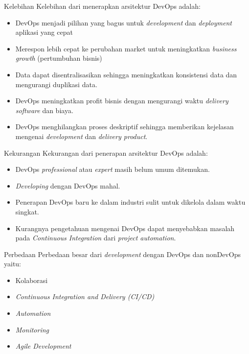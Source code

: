 \documentclass{beamer}
\begin{document}
	\begin{frame}{Kelebihan}
		Kelebihan dari menerapkan arsitektur DevOps adalah:
		\begin{itemize}
			\item DevOps menjadi pilihan yang bagus untuk \textit{development} dan \textit{deployment} aplikasi yang cepat
			\item Merespon lebih cepat ke perubahan market untuk meningkatkan \textit{business growth} (pertumbuhan bisnis)
			\item Data dapat disentralisasikan sehingga meningkatkan konsistensi data dan mengurangi duplikasi data.
			\item DevOps meningkatkan profit bisnis dengan mengurangi waktu \textit{delivery software} dan biaya.
			\item DevOps menghilangkan proses deskriptif sehingga memberikan kejelasan mengenai \textit{development} dan \textit{delivery product}.
			
		\end{itemize}
	\end{frame}
	
	\begin{frame}{Kekurangan}
		Kekurangan dari penerapan arsitektur DevOps adalah:
		\begin{itemize}
			\item DevOps \textit{professional} atau \textit{expert} masih belum umum ditemukan.
			\item \textit{Developing} dengan DevOps mahal.
			\item Penerapan DevOps baru ke dalam industri sulit untuk dikelola dalam waktu singkat.
			\item 	Kurangnya pengetahuan mengenai DevOps dapat menyebabkan masalah pada \textit{Continuous Integration} dari \textit{project automation}.
		\end{itemize}
	\end{frame}
	
	\begin{frame}{Perbedaan}
		Perbedaan besar dari \textit{development} dengan DevOps dan nonDevOps yaitu:
		\begin{itemize}
			\item Kolaborasi
			\item \textit{Continuous Integration and Delivery (CI/CD)}
			\item \textit{Automation}
			\item \textit{Monitoring}
			\item \textit{Agile Development}
		\end{itemize}
	\end{frame}
\end{document}
